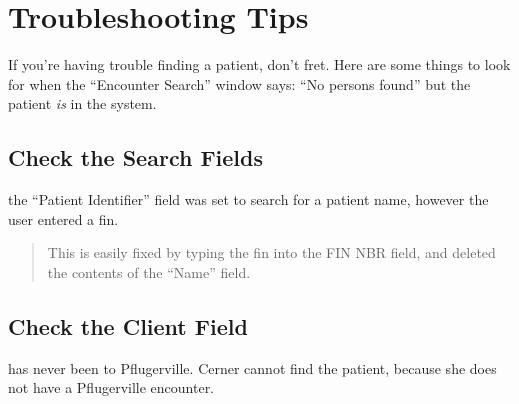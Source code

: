 
\section{Troubleshooting Tips\label{sec:doe_ptlookup_trouble}}

If you're having trouble finding a patient, don't fret. Here are some things to look for when the ``Encounter Search'' window says: ``No persons found'' but the patient \textit{is} in the system.

\subsection{Check the Search Fields}
 the ``Patient Identifier'' field was set to search for a patient name, however the user entered a \gls{fin}.\\

%

\begin{quote}
 This is easily fixed by typing the \gls{fin} into the FIN NBR field, and deleted the contents of the ``Name'' field.
\end{quote}

\subsection{Check the Client Field}

 has never been to Pflugerville. Cerner cannot find the patient, because she does not have a Pflugerville encounter.\\

